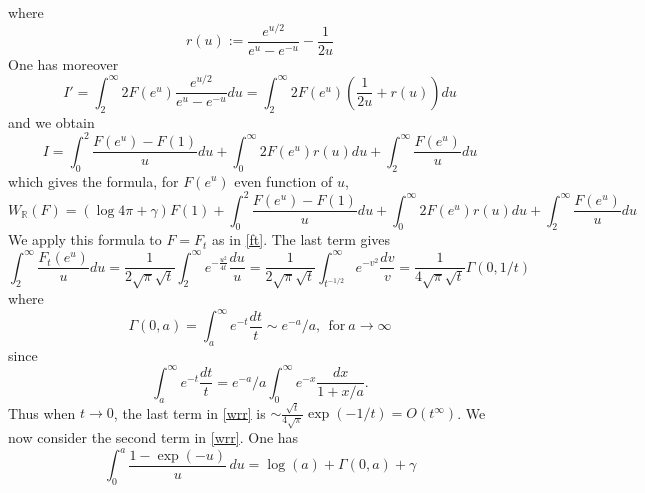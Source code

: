 \documentclass[reqno,12pt]{amsart}
\def\R{{\mathbb R}}
\begin{document}
where
 $$r(u):=\frac{e^{u/2}}{e^u-e^{-u}}-\frac {1}{2u}$$
One has moreover
$$
I'=\int_{2}^\infty 2F(e^u) \frac{e^{u/2}}{e^u-e^{-u}}du=\int_{2}^\infty2F(e^u)\left(\frac {1}{2u}+r(u)\right)du
$$
and we obtain 
$$
I=\int_0^2 \frac{F(e^u)-F(1)}{u}du+\int_{0}^\infty 2F(e^u)r(u)du+\int_2^\infty \frac{F(e^u)}{u}du
$$
which gives the formula, for $F(e^u)$ even function of $u$,
\begin{equation}\label{wrr}
	W_\R(F)=(\log 4\pi +\gamma)F(1)+\int_0^2 \frac{F(e^u)-F(1)}{u}du+\int_{0}^\infty 2F(e^u)r(u)du+\int_2^\infty \frac{F(e^u)}{u}du
\end{equation}
We apply this formula to $F=F_t$ as in \eqref{ft}. The last term gives
$$
\int_2^\infty \frac{F_t(e^u)}{u}du=\frac{1}{2\sqrt{ \pi } \sqrt{t}}\int_2^\infty e^{-\frac{u^2}{4 t}}\frac{du}{u}=\frac{1}{2\sqrt{ \pi } \sqrt{t}}\int_{t^{-1/2}}^\infty e^{-v^2}\frac{dv}{v}=\frac{1}{4\sqrt{ \pi } \sqrt{t}}\Gamma (0,1/t)
$$
where 
 \begin{equation}\label{gam0a}
 \Gamma (0,a)=\int _a^{\infty } e^{-t}\frac{dt}{t}\sim e^{-a}/a, \ \ \text{for}\ a\to \infty
 \end{equation}
 since
 $$
 \int _a^{\infty } e^{-t}\frac{dt}{t}=e^{-a}/a \int _0^{\infty } e^{-x}\frac{dx}{1+x/a}.
 $$
 Thus when $t\to 0$, the  last term in \eqref{wrr} is $\sim \frac{\sqrt{t}}{4\sqrt{ \pi } }\exp(-1/t)=O(t^\infty)$. \newline
 We now consider the second term in \eqref{wrr}. 
 One has 
 $$
 \int_0^a \frac{1-\exp (-u)}{u} \, du=\log (a)+\Gamma (0,a)+\gamma
 $$
 
\end{document}
